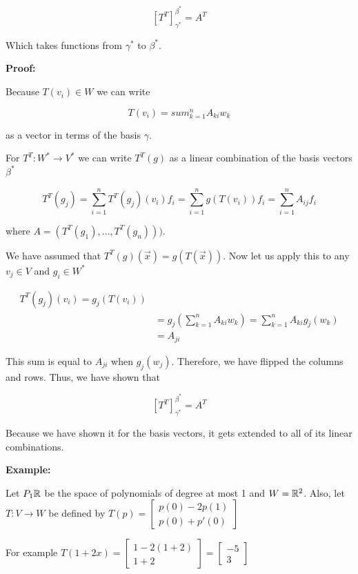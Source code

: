\[
    [T^T]_{\gamma^*}^{\beta^*}  = A^T
\]

Which takes functions from \(\gamma^*\) to \(\beta^*\).

\textbf{Proof:}

Because \(T(v_i) \in W\) we can write

\[
    T(v_i) = sum_{k = 1}^{n} A_{ki} w_{k}
\]

as a vector in terms of the basis \(\gamma\).

For \(T^T: W^* \to V^*\) we can write \(T^T(g)\) as a linear combination of the basis vectors \(\beta^*\)

\[
    T^T(g_j) = \sum_{i = 1}^{n} T^T(g_j)(v_i) f_i = \sum_{i = 1}^{n} g(T(v_i)) f_i  = \sum_{i = 1}^{n} A_{ij} f_{i}
\]

where \(A = (T^T(g_1), \dots, T^T(g_n)))\).

We have assumed that \(T^T(g)(\vec{x}) = g (T(\vec{x}))\). Now let us apply this to any \(v_j \in V\)
and \(g_i \in W^*\)

\begin{align*}
    T^T(g_j)(v_i) = g_j(T(v_i))                                                                \\
     & =  g_j \left(\sum_{k = 1}^{n} A_{ki} w_{k}\right) =  \sum_{k = 1}^{n} A_{ki} g_{j}(w_k) \\
     & = A_{ji}
\end{align*}

This sum is equal to \(A_{ji}\) when \(g_j(w_j)\). Therefore, we have flipped the columns
and rows. Thus, we have shown that

\[
    [T^T]_{\gamma^*}^{\beta^*}  = A^T
\]

Because we have shown it for the basis vectors, it gets extended to all of its linear combinations.

\QED

\textbf{Example:}

Let \(P_1 \mathbb{R}\) be the space of polynomials of degree at most 1 and \(W = \mathbb{R}^2\). Also,
let \(T: V \to W\) be defined by \(T(p) = \begin{bmatrix} p(0) - 2p(1) \\ p(0) + p'(0)\end{bmatrix}\)

For example \(T(1 + 2x) = \begin{bmatrix} 1 - 2(1 + 2) \\ 1 + 2 \end{bmatrix} = \begin{bmatrix} -5 \\ 3 \end{bmatrix}\)

